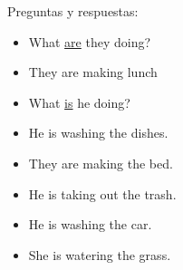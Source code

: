 Preguntas y respuestas:
\begin{itemize}
	\item What \underline{are} they doing? \arr {}
	\item They are making lunch \arr {}
	\item What \underline{is} he doing? \arr {}
	\item He is washing the dishes. \arr {}
	\item They are making the bed. \arr {}
	\item He is taking out the trash. \arr {}
	\item He is washing the car. \arr {}
	\item She is watering the grass. \arr {}
\end{itemize}
